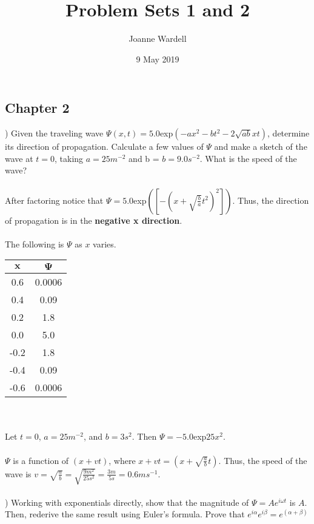 \documentclass[12pt]{article}
\title{\vspace{-2.0cm}Problem Sets 1 and 2}
\author{Joanne Wardell}
\date{9 May 2019}
\begin{document}
\maketitle

\subsection*{Chapter 2}

) Given the traveling wave $\Psi(x,t) = 5.0$exp$(-ax^{2}-bt^{2}-
2\sqrt{ab}xt)$, determine its direction of propagation. Calculate a few 
values of $\Psi$ and make a sketch of the wave at $t = 0$, taking $a = 25m^{-2}$ and 
b = $b = 9.0s^{-2}$. What is the speed of the wave?\\\\
\noindent After factoring notice that 
$\Psi = 5.0$exp$([-(x+\sqrt{\frac{b}{a}}t^{2})^{2}])$. Thus, the direction 
of propagation is in the \textbf{negative x direction}.\\\\
The following is $\Psi$ as $x$ varies.\\
\begin{tabular}{c|c}
  $\mathbf{x}$ & $\mathbf{\Psi}$ \\ \hline
  0.6 & 0.0006\\
  0.4 & 0.09\\
  0.2 & 1.8\\
  0.0 & 5.0\\
  -0.2 & 1.8\\
  -0.4 & 0.09\\
  -0.6 & 0.0006\\
\end{tabular} \\\\

\noindent Let $t = 0$, $a = 25m^{-2}$, and $b = 3s^{2}$. Then 
$\Psi = -5.0$exp$25x^{2}$.\\\\


\noindent $\Psi$ is a function of $(x + vt)$, where $x + vt = (x + \sqrt{\frac{a}{b}}t)$. 
Thus, the speed of the wave is $v = \sqrt{\frac{a}{b}} = \sqrt{\frac{9m^{2}}{25s^{2}}} 
= \frac{3m}{5s} = 0.6ms^{-1}$.\\\\

) Working with exponentials directly, show that the magnitude of 
$\Psi = Ae^{i\omega t}$ is $A$. Then, rederive the same result using Euler's formula. 
Prove that $e^{i\alpha}e^{i\beta} = e^{(\alpha + \beta)}$\\\\
\end{document}
